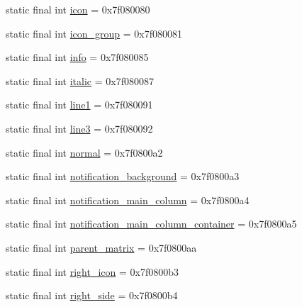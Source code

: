 \begin{DoxyCompactItemize}
\item 
static final int \mbox{\hyperlink{classandroid_1_1support_1_1transition_1_1_r_1_1id_aa2f972494c0d7b910dd334c97f0772e6}{icon}} = 0x7f080080
\item 
static final int \mbox{\hyperlink{classandroid_1_1support_1_1transition_1_1_r_1_1id_a08ac623c6ab50ea0df40c5238d71d1c4}{icon\+\_\+group}} = 0x7f080081
\item 
static final int \mbox{\hyperlink{classandroid_1_1support_1_1transition_1_1_r_1_1id_ae08413c0d77b9044bbe26ee181089869}{info}} = 0x7f080085
\item 
static final int \mbox{\hyperlink{classandroid_1_1support_1_1transition_1_1_r_1_1id_a7213dcb4b1139d5bf1ce002b876e5de1}{italic}} = 0x7f080087
\item 
static final int \mbox{\hyperlink{classandroid_1_1support_1_1transition_1_1_r_1_1id_a2ab7b382860fb7936200212780d2132a}{line1}} = 0x7f080091
\item 
static final int \mbox{\hyperlink{classandroid_1_1support_1_1transition_1_1_r_1_1id_a80854f8678321c5cb7a484e765f9dc81}{line3}} = 0x7f080092
\item 
static final int \mbox{\hyperlink{classandroid_1_1support_1_1transition_1_1_r_1_1id_a1c89776c0d58c58e156d6de957fb1ea2}{normal}} = 0x7f0800a2
\item 
static final int \mbox{\hyperlink{classandroid_1_1support_1_1transition_1_1_r_1_1id_a3dc75722edc5e00de09783de28d80caf}{notification\+\_\+background}} = 0x7f0800a3
\item 
static final int \mbox{\hyperlink{classandroid_1_1support_1_1transition_1_1_r_1_1id_a381db437d0b325d78a0ff8c46dc77ff1}{notification\+\_\+main\+\_\+column}} = 0x7f0800a4
\item 
static final int \mbox{\hyperlink{classandroid_1_1support_1_1transition_1_1_r_1_1id_ae81ddff59aa2cc6a5d146fa6fd8e9969}{notification\+\_\+main\+\_\+column\+\_\+container}} = 0x7f0800a5
\item 
static final int \mbox{\hyperlink{classandroid_1_1support_1_1transition_1_1_r_1_1id_acab020b8ca2cbd92c45c2229e7b00179}{parent\+\_\+matrix}} = 0x7f0800aa
\item 
static final int \mbox{\hyperlink{classandroid_1_1support_1_1transition_1_1_r_1_1id_a9755609f3032042fe7e83172281f4006}{right\+\_\+icon}} = 0x7f0800b3
\item 
static final int \mbox{\hyperlink{classandroid_1_1support_1_1transition_1_1_r_1_1id_a96d440979b8fc848595de58aee89e4a4}{right\+\_\+side}} = 0x7f0800b4
\item 

\end{DoxyCompactItemize}
